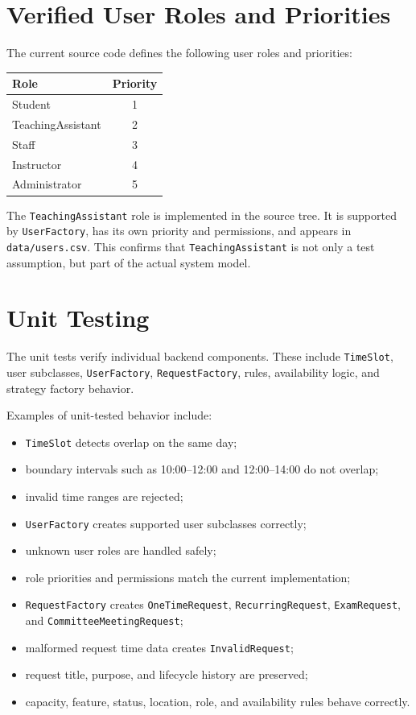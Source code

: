 \documentclass[12pt,a4paper]{article}
\begin{document}
\section{Verified User Roles and Priorities}

The current source code defines the following user roles and priorities:

\begin{center}
\begin{tabularx}{0.65\textwidth}{@{} X c @{}}
\toprule
\textbf{Role} & \textbf{Priority} \\
\midrule
Student & 1 \\
TeachingAssistant & 2 \\
Staff & 3 \\
Instructor & 4 \\
Administrator & 5 \\
\bottomrule
\end{tabularx}
\end{center}

The \texttt{TeachingAssistant} role is implemented in the source tree. It is supported by \texttt{UserFactory}, has its own priority and permissions, and appears in \texttt{data/users.csv}. This confirms that \texttt{TeachingAssistant} is not only a test assumption, but part of the actual system model.

\section{Unit Testing}

The unit tests verify individual backend components. These include \texttt{TimeSlot}, user subclasses, \texttt{UserFactory}, \texttt{RequestFactory}, rules, availability logic, and strategy factory behavior.

Examples of unit-tested behavior include:

\begin{itemize}
    \item \texttt{TimeSlot} detects overlap on the same day;
    \item boundary intervals such as 10:00--12:00 and 12:00--14:00 do not overlap;
    \item invalid time ranges are rejected;
    \item \texttt{UserFactory} creates supported user subclasses correctly;
    \item unknown user roles are handled safely;
    \item role priorities and permissions match the current implementation;
    \item \texttt{RequestFactory} creates \texttt{OneTimeRequest}, \texttt{RecurringRequest}, \texttt{ExamRequest}, and \texttt{CommitteeMeetingRequest};
    \item malformed request time data creates \texttt{InvalidRequest};
    \item request title, purpose, and lifecycle history are preserved;
    \item capacity, feature, status, location, role, and availability rules behave correctly.
\end{itemize}
\end{document}
